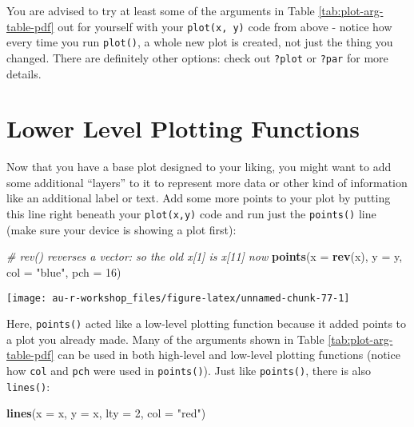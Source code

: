 \documentclass[]{book}
\newenvironment{Shaded}{\begin{snugshade}}{\end{snugshade}}
\newcommand{\KeywordTok}[1]{\textcolor[rgb]{0.13,0.29,0.53}{\textbf{#1}}}
\newcommand{\DataTypeTok}[1]{\textcolor[rgb]{0.13,0.29,0.53}{#1}}
\newcommand{\DecValTok}[1]{\textcolor[rgb]{0.00,0.00,0.81}{#1}}
\newcommand{\StringTok}[1]{\textcolor[rgb]{0.31,0.60,0.02}{#1}}
\newcommand{\CommentTok}[1]{\textcolor[rgb]{0.56,0.35,0.01}{\textit{#1}}}
\newcommand{\NormalTok}[1]{#1}
\theoremstyle{definition}
\theoremstyle{definition}
\theoremstyle{definition}
\theoremstyle{remark}
\begin{document}
You are advised to try at least some of the arguments in Table
\ref{tab:plot-arg-table-pdf} out for yourself with your
\texttt{plot(x,\ y)} code from above - notice how every time you run
\texttt{plot()}, a whole new plot is created, not just the thing you
changed. There are definitely other options: check out \texttt{?plot} or
\texttt{?par} for more details.

\section{Lower Level Plotting
Functions}\label{lower-level-plotting-functions}

Now that you have a base plot designed to your liking, you might want to
add some additional ``layers'' to it to represent more data or other
kind of information like an additional label or text. Add some more
points to your plot by putting this line right beneath your
\texttt{plot(x,y)} code and run just the \texttt{points()} line (make
sure your device is showing a plot first):

\begin{Shaded}
\begin{Highlighting}[]
\CommentTok{# rev() reverses a vector: so the old x[1] is x[11] now}
\KeywordTok{points}\NormalTok{(}\DataTypeTok{x =} \KeywordTok{rev}\NormalTok{(x), }\DataTypeTok{y =}\NormalTok{ y, }\DataTypeTok{col =} \StringTok{"blue"}\NormalTok{, }\DataTypeTok{pch =} \DecValTok{16}\NormalTok{)}
\end{Highlighting}
\end{Shaded}

\begin{center}\texttt{[image: au-r-workshop\_files/figure-latex/unnamed-chunk-77-1]} \end{center}

Here, \texttt{points()} acted like a low-level plotting function because
it added points to a plot you already made. Many of the arguments shown
in Table \ref{tab:plot-arg-table-pdf} can be used in both high-level and
low-level plotting functions (notice how \texttt{col} and \texttt{pch}
were used in \texttt{points()}). Just like \texttt{points()}, there is
also \texttt{lines()}:

\begin{Shaded}
\begin{Highlighting}[]
\KeywordTok{lines}\NormalTok{(}\DataTypeTok{x =}\NormalTok{ x, }\DataTypeTok{y =}\NormalTok{ x, }\DataTypeTok{lty =} \DecValTok{2}\NormalTok{, }\DataTypeTok{col =} \StringTok{"red"}\NormalTok{)}
\end{Highlighting}
\end{Shaded}
\end{document}
